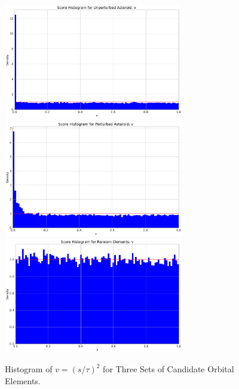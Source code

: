 \begin{figure}[hbt!]
\begin{center}
\includegraphics[width=0.70\textwidth]{../figs/elts/v_hist_unperturbed.png}
\includegraphics[width=0.70\textwidth]{../figs/elts/v_hist_perturbed.png}
\includegraphics[width=0.70\textwidth]{../figs/elts/v_hist_random.png}
\end{center}
\caption[Histogram of $v = (s/\tau)^2$ for Three Sets of Candidate Orbital Elements]
{Histogram of $v = (s/\tau)^2$ for Three Sets of Candidate Orbital Elements.}
\label{fig:candidate_elt_v}
\end{figure}
\clearpage

